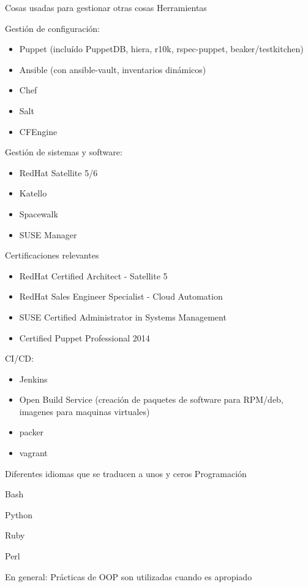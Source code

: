 \begin{cventries}
  \cventry
    {Cosas usadas para gestionar otras cosas}
    {Herramientas}
    {}
    {}
    {
      \begin{cvitems}
      \item Gestión de configuración:
          \begin{itemize}
            \item Puppet (incluído PuppetDB, hiera, r10k, rspec-puppet, beaker/testkitchen)
            \item Ansible (con ansible-vault, inventarios dinámicos)
            \item Chef
            \item Salt
            \item CFEngine
          \end{itemize}
        \item Gestión de sistemas y software:
        \begin{itemize}
          \item RedHat Satellite 5/6
          \item Katello
          \item Spacewalk
          \item SUSE Manager
        \end{itemize}
        \item Certificaciones relevantes
          \begin{itemize}
            \item RedHat Certified Architect - Satellite 5
            \item RedHat Sales Engineer Specialist - Cloud Automation
            \item SUSE Certified Administrator in Systems Management
            \item Certified Puppet Professional 2014
          \end{itemize}
      \item CI/CD:
        \begin{itemize}
          \item Jenkins
          \item Open Build Service (creación de paquetes de software para RPM/deb, imagenes para
            maquinas virtuales)
          \item packer
          \item vagrant
        \end{itemize}
      \end{cvitems}
    }

  \cventry
    {Diferentes idiomas que se traducen a unos y ceros}
    {Programación}
    {}
    {}
    {
      \begin{cvitems}
        \item Bash
        \item Python
        \item Ruby
        \item Perl
        \item En general: Prácticas de OOP son utilizadas cuando es apropiado
      \end{cvitems}
    }

\end{cventries}

